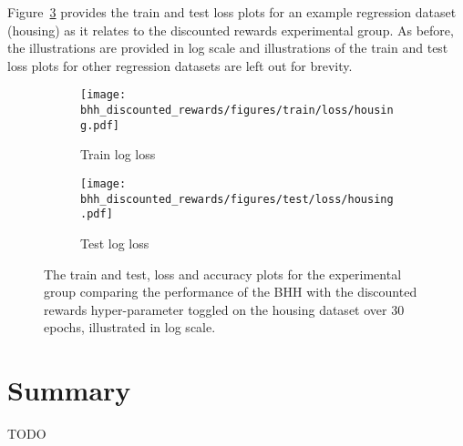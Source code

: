 Figure~\ref{fig:results:discounted_rewards:figures:housing} provides the train and test loss plots for an example regression dataset (housing) as it relates to the discounted rewards experimental group. As before, the illustrations are provided in log scale and illustrations of the train and test loss plots for other regression datasets are left out for brevity.

\begin{figure}[htb]
	\begin{subfigure}{0.5\textwidth}
		\centering
		\texttt{[image: bhh\_discounted\_rewards/figures/train/loss/housing.pdf]}
		\caption{Train log loss}
		\label{fig:results:discounted_rewards:figures:loss:train:housing}
	\end{subfigure}
	\begin{subfigure}{0.5\textwidth}
		\centering
		\texttt{[image: bhh\_discounted\_rewards/figures/test/loss/housing.pdf]}
		\caption{Test log loss}
		\label{fig:results:discounted_rewards:figures:loss:test:housing}
	\end{subfigure}
	\par\bigskip
	\caption{The train and test, loss and accuracy plots for the experimental group comparing the performance of the \acs{BHH} with the discounted rewards hyper-parameter toggled on the housing dataset over 30 epochs, illustrated in log scale.}
	\label{fig:results:discounted_rewards:figures:housing}
\end{figure}

\section{Summary}\label{sec:results:summary}

TODO